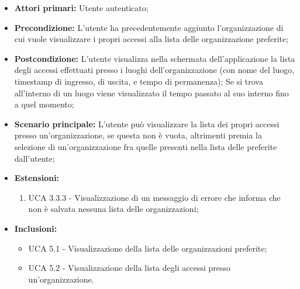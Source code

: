 \begin{itemize}
    \item \textbf{Attori primari:} Utente autenticato;
    \item \textbf{Precondizione:} L'utente ha precedentemente aggiunto l'organizzazione di cui vuole visualizzare i propri accessi alla lista delle organizzazione preferite;
    \item \textbf{Postcondizione:} L'utente visualizza nella schermata dell'applicazione la lista degli accessi effettuati presso i luoghi dell'organizzazione (con nome del luogo, timestamp di ingresso, di uscita, e tempo di permanenza);
    Se si trova all'interno di un luogo viene visualizzato il tempo passato al suo interno fino a quel momento;
    \item \textbf{Scenario principale:} L'utente può visualizzare la lista dei propri accessi presso un'organizzazione, se questa non è vuota, altrimenti premia la selezione di un'organizzazione fra quelle presenti nella lista delle preferite dall'utente; %
    \item \textbf{Estensioni:}
    \begin{enumerate}
        \item UCA 3.3.3 - Visualizzazione di un messaggio di errore che informa che non è salvata nessuna lista delle organizzazioni;	
    \end{enumerate}	
    \item \textbf{Inclusioni:}
    \begin{itemize}
        \item UCA 5.1 - Visualizzazione della lista delle organizzazioni preferite;
        \item UCA 5.2 - Visualizzazione della lista degli accessi presso un'organizzazione.
    \end{itemize}

\end{itemize}


